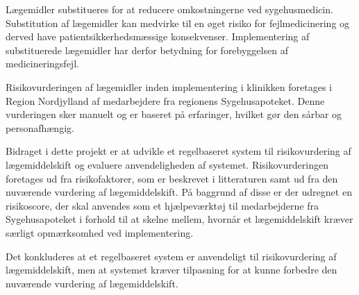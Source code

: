 \vspace{-0.3cm}
Lægemidler substitueres for at reducere omkostningerne ved sygehusmedicin. Substitution af lægemidler kan medvirke til en øget risiko for fejlmedicinering og derved have patientsikkerhedsmæssige konsekvenser. Implementering af substituerede lægemidler har derfor betydning for forebyggelsen af medicineringsfejl. 

Risikovurderingen af lægemidler inden implementering i klinikken foretages i Region Nordjylland af medarbejdere fra regionens Sygehusapoteket. Denne vurderingen sker manuelt og er baseret på erfaringer, hvilket gør den sårbar og personafhængig. 


Bidraget i dette projekt er at udvikle et regelbaseret system til risikovurdering af lægemiddelskift og evaluere anvendeligheden af systemet. Risikovurderingen foretages ud fra risikofaktorer, som er beskrevet i litteraturen samt ud fra den nuværende vurdering af lægemiddelskift. På baggrund af disse er der udregnet en risikoscore, der skal anvendes som et hjælpeværktøj til medarbejderne fra Sygehusapoteket i forhold til at skelne mellem, hvornår et lægemiddelskift kræver særligt opmærksomhed ved implementering.

Det konkluderes at et regelbaseret system er anvendeligt til risikovurdering af lægemiddelskift, men at systemet kræver tilpasning for at kunne forbedre den nuværende vurdering af lægemiddelskift.
\vspace{-0.2cm}